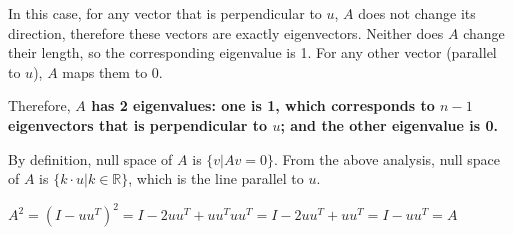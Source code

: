 \documentclass[
  course = {{16-811 Math Fundamentals for Robotics}},
  quartile = {{1}},
  assignment = 1,
  name = {{Kangle Deng}},
  email = {{kangled@andrew.cmu.edu}},
  firstexercise = 1
]{aga-homework}
\begin{document}
In this case, for any vector that is perpendicular to $u$, $A$ does not change its direction, therefore these vectors are exactly eigenvectors. Neither does $A$ change their length, so the corresponding eigenvalue is 1. For any other vector (parallel to $u$), $A$ maps them to 0.

Therefore, \textbf{$A$ has 2 eigenvalues: one is 1, which corresponds to $n-1$ eigenvectors that is perpendicular to $u$; and the other eigenvalue is 0.}

\subexercise
By definition, null space of $A$ is $\{v | Av = 0\}$. From the above analysis, null space of $A$ is $\{k \cdot u | k \in \mathbb{R}\}$, which is the line parallel to $u$.

\subexercise
$A^2 = (I - uu^T)^2 = I - 2uu^T + uu^Tuu^T = I - 2uu^T + uu^T = I - uu^T = A$

\exercise








\end{document}

